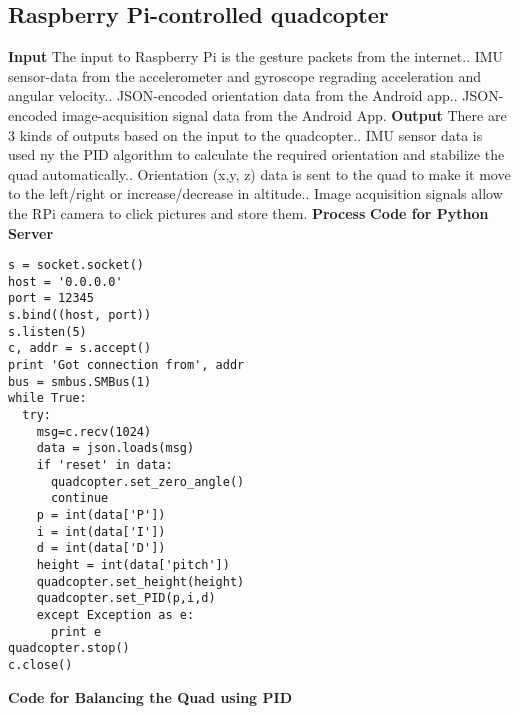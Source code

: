 \subsection{Raspberry Pi-controlled quadcopter}
\textbf{Input}\newline
The input to Raspberry Pi is the gesture packets from the internet.. IMU sensor-data from the accelerometer and gyroscope regrading acceleration and angular velocity.. JSON-encoded orientation data from the Android app.. JSON-encoded image-acquisition signal data from the Android App.\newline
\textbf{Output}\newline
There are 3 kinds of outputs based on the input to the quadcopter.. IMU sensor data is used ny the PID algorithm to calculate the required orientation and stabilize the quad automatically.. Orientation (x,y, z) data is sent to the quad to make it move to the left/right or increase/decrease in altitude.. Image acquisition signals allow the RPi camera to click pictures and store them.\newline
\textbf{Process}\newline
\textbf{Code for Python Server}\newline
\begin{lstlisting}
s = socket.socket()         
host = '0.0.0.0'      
port = 12345          
s.bind((host, port))   
s.listen(5)            
c, addr = s.accept()   
print 'Got connection from', addr
bus = smbus.SMBus(1)
while True:
  try:
    msg=c.recv(1024)
    data = json.loads(msg)
    if 'reset' in data:
      quadcopter.set_zero_angle()
      continue
    p = int(data['P'])
    i = int(data['I'])
    d = int(data['D'])
    height = int(data['pitch'])
    quadcopter.set_height(height)
    quadcopter.set_PID(p,i,d)
    except Exception as e:
      print e
quadcopter.stop()
c.close()        
\end{lstlisting} 
\textbf{Code for Balancing the Quad using PID}\newline
